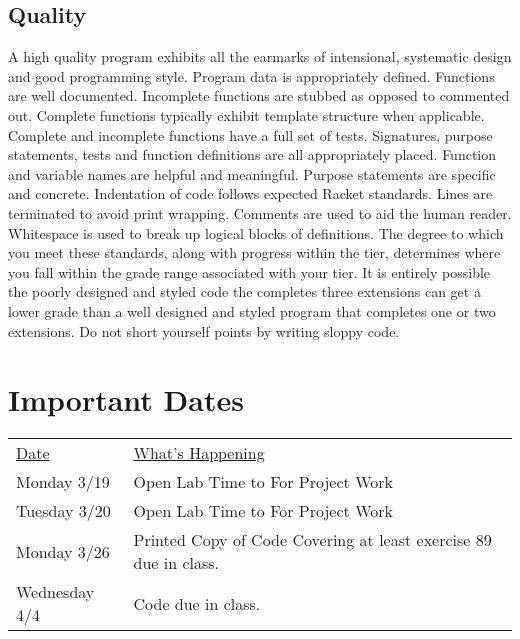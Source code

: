 \documentclass[nobib]{tufte-handout}
\begin{document}
  \subsection*{Quality}

  A high quality program exhibits all the earmarks of intensional, systematic design and good programming style. Program data is appropriately defined. Functions are well documented. Incomplete functions are stubbed as opposed to commented out. Complete functions typically exhibit template structure when applicable. Complete and incomplete functions have a full set of tests. Signatures, purpose statements, tests and function definitions are all appropriately placed.  Function and variable names are helpful and meaningful. Purpose statements are specific and concrete. Indentation of code follows expected Racket standards. Lines are terminated to avoid print wrapping. Comments are used to aid the human reader. Whitespace is used to break up logical blocks of definitions. The degree to which you meet these standards, along with progress within the tier, determines where you fall within the grade range associated with your tier. It is entirely possible the poorly designed and styled code the completes three extensions can get a lower grade than a well designed and styled program that completes one or two extensions. Do not short yourself points by writing sloppy code.


  \section*{Important Dates}

  \begin{tabular}{ll}
    \underline{Date} & \underline{What's Happening} \\
     Monday 3/19 & Open Lab Time to For Project Work \\
     Tuesday 3/20 & Open Lab Time to For Project Work \\
     Monday 3/26 & Printed Copy of Code Covering at least exercise 89 due in class. \\
     Wednesday 4/4 & Code due in class. \\
  \end{tabular}
\end{document}
